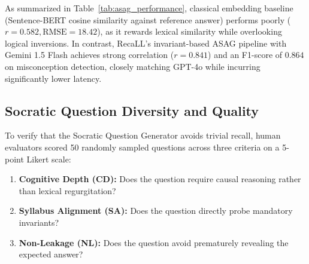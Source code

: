 \documentclass[conference]{IEEEtran}
\begin{document}
\begin{table}[t]
\caption{Automated Short-Answer Grading (ASAG) Performance Compared Against Human Expert Ground Truth}
\label{tab:asag_performance}
\centering
\setlength{\tabcolsep}{3.5pt}
\end{table}

As summarized in Table~\ref{tab:asag_performance}, classical embedding baseline (Sentence-BERT cosine similarity against reference answer) performs poorly ($r = 0.582, \text{RMSE} = 18.42$), as it rewards lexical similarity while overlooking logical inversions. In contrast, RecaLL's invariant-based ASAG pipeline with Gemini 1.5 Flash achieves strong correlation ($r = 0.841$) and an F1-score of $0.864$ on misconception detection, closely matching GPT-4o while incurring significantly lower latency.

\subsection{Socratic Question Diversity and Quality}
To verify that the Socratic Question Generator avoids trivial recall, human evaluators scored 50 randomly sampled questions across three criteria on a 5-point Likert scale:
\begin{enumerate}
    \item \textbf{Cognitive Depth (CD):} Does the question require causal reasoning rather than lexical regurgitation?
    \item \textbf{Syllabus Alignment (SA):} Does the question directly probe mandatory invariants?
    \item \textbf{Non-Leakage (NL):} Does the question avoid prematurely revealing the expected answer?
\end{enumerate}
\end{document}
